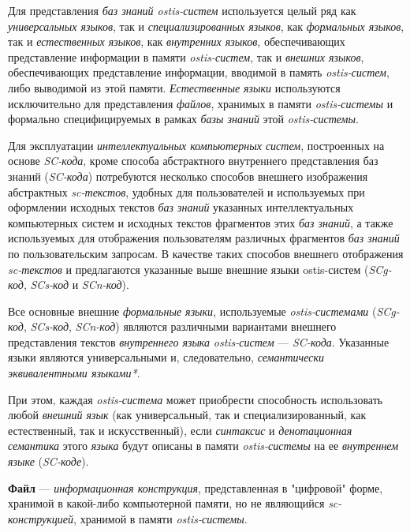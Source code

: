 Для представления \textit{баз знаний ostis-систем} используется целый ряд как \textit{универсальных языков}, так и \textit{специализированных языков}, как \textit{формальных языков}, так и \textit{естественных языков}, как \textit{внутренних языков}, обеспечивающих представление информации в памяти \textit{ostis-систем}, так и \textit{внешних языков}, обеспечивающих представление информации, вводимой в память \textit{ostis-систем}, либо выводимой из этой памяти. \textit{Естественные языки} используются исключительно для представления \textit{файлов}, хранимых в памяти \textit{ostis-системы} и формально специфицируемых в рамках \textit{базы знаний} этой \textit{ostis-системы}.

Для эксплуатации \textit{интеллектуальных компьютерных систем}, построенных на основе \textit{SC-кода}, кроме способа абстрактного внутреннего представления баз знаний (\textit{SC-кода}) потребуются несколько способов внешнего изображения абстрактных \textit{sc-текстов}, удобных для пользователей и используемых при оформлении исходных текстов \textit{баз знаний} указанных интеллектуальных компьютерных систем и исходных текстов фрагментов этих \textit{баз знаний}, а также используемых для отображения пользователям различных фрагментов \textit{баз знаний} по пользовательским запросам.
В качестве таких способов внешнего отображения \textit{sc-текстов} и предлагаются указанные выше внешние языки ostis-систем (\textit{SCg-код}, \textit{SCs-код} и  \textit{SCn-код}).

Все основные внешние \textit{формальные языки}, используемые \textit{ostis-системами} (\textit{SCg-код}, \textit{SCs-код}, \textit{SCn-код}) являются различными вариантами внешнего представления текстов \textit{внутреннего языка} \textit{ostis-систем} --- \textit{SC-кода}.
Указанные языки являются универсальными и, следовательно, \textit{семантически эквивалентными языками*}.

При этом, каждая \textit{ostis-система} может приобрести способность использовать любой \textit{внешний язык} (как универсальный, так и специализированный, как естественный, так и искусственный), если \textit{синтаксис} и \textit{денотационная семантика} этого \textit{языка} будут описаны в памяти \textit{ostis-системы} на ее \textit{внутреннем языке} (\textit{SC-коде}).

\textbf{Файл} --- \textit{информационная конструкция}, представленная в "цифровой" форме, хранимой в какой-либо компьютерной памяти, но не являющийся \textit{sc-конструкцией}, хранимой в памяти \textit{ostis-системы}.

